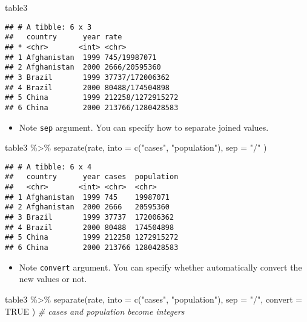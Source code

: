 \documentclass[
]{book}
\newenvironment{Shaded}{\begin{snugshade}}{\end{snugshade}}
\newcommand{\AttributeTok}[1]{\textcolor[rgb]{0.77,0.63,0.00}{#1}}
\newcommand{\CommentTok}[1]{\textcolor[rgb]{0.56,0.35,0.01}{\textit{#1}}}
\newcommand{\ConstantTok}[1]{\textcolor[rgb]{0.00,0.00,0.00}{#1}}
\newcommand{\FunctionTok}[1]{\textcolor[rgb]{0.00,0.00,0.00}{#1}}
\newcommand{\NormalTok}[1]{#1}
\newcommand{\SpecialCharTok}[1]{\textcolor[rgb]{0.00,0.00,0.00}{#1}}
\newcommand{\StringTok}[1]{\textcolor[rgb]{0.31,0.60,0.02}{#1}}
\providecommand{\tightlist}{%
  \setlength{\itemsep}{0pt}\setlength{\parskip}{0pt}}
\begin{document}
\begin{Shaded}
\begin{Highlighting}[]
\NormalTok{table3}
\end{Highlighting}
\end{Shaded}

\begin{verbatim}
## # A tibble: 6 x 3
##   country      year rate             
## * <chr>       <int> <chr>            
## 1 Afghanistan  1999 745/19987071     
## 2 Afghanistan  2000 2666/20595360    
## 3 Brazil       1999 37737/172006362  
## 4 Brazil       2000 80488/174504898  
## 5 China        1999 212258/1272915272
## 6 China        2000 213766/1280428583
\end{verbatim}

\begin{itemize}
\tightlist
\item
  Note \texttt{sep} argument. You can specify how to separate joined values.
\end{itemize}

\begin{Shaded}
\begin{Highlighting}[]
\NormalTok{table3 }\SpecialCharTok{\%\textgreater{}\%}
  \FunctionTok{separate}\NormalTok{(rate,}
    \AttributeTok{into =} \FunctionTok{c}\NormalTok{(}\StringTok{"cases"}\NormalTok{, }\StringTok{"population"}\NormalTok{),}
    \AttributeTok{sep =} \StringTok{"/"}
\NormalTok{  )}
\end{Highlighting}
\end{Shaded}

\begin{verbatim}
## # A tibble: 6 x 4
##   country      year cases  population
##   <chr>       <int> <chr>  <chr>     
## 1 Afghanistan  1999 745    19987071  
## 2 Afghanistan  2000 2666   20595360  
## 3 Brazil       1999 37737  172006362 
## 4 Brazil       2000 80488  174504898 
## 5 China        1999 212258 1272915272
## 6 China        2000 213766 1280428583
\end{verbatim}

\begin{itemize}
\tightlist
\item
  Note \texttt{convert} argument. You can specify whether automatically convert the new values or not.
\end{itemize}

\begin{Shaded}
\begin{Highlighting}[]
\NormalTok{table3 }\SpecialCharTok{\%\textgreater{}\%}
  \FunctionTok{separate}\NormalTok{(rate,}
    \AttributeTok{into =} \FunctionTok{c}\NormalTok{(}\StringTok{"cases"}\NormalTok{, }\StringTok{"population"}\NormalTok{),}
    \AttributeTok{sep =} \StringTok{"/"}\NormalTok{,}
    \AttributeTok{convert =} \ConstantTok{TRUE}
\NormalTok{  ) }\CommentTok{\# cases and population become integers}
\end{Highlighting}
\end{Shaded}
\end{document}
